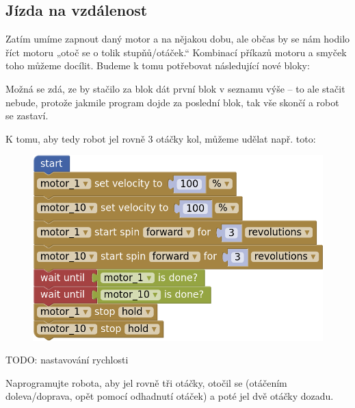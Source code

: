 \documentclass[../main.tex]{subfiles}
\begin{document}
	\subsection{Jízda na vzdálenost}\label{cha:distanceride}
	Zatím umíme zapnout daný motor a na nějakou dobu, ale občas by se nám hodilo říct motoru „otoč se o tolik stupňů/otáček.“ Kombinací příkazů motoru a smyček toho můžeme docílit. Budeme k tomu potřebovat následující nové bloky:
	\begin{itemize}
		\blockMotorDistance
		\blockMotorVelocity
		\blockWaitUntil
		\blockMotorDone
	\end{itemize}

	Možná se zdá, ze by stačilo za \blockStartImage blok dát první blok v seznamu výše -- to ale stačit nebude, protože jakmile program dojde za poslední blok, tak vše skončí a robot se zastaví.

	K tomu, aby tedy robot jel rovně 3 otáčky kol, můžeme udělat např. toto:

	\begin{figure}
		\centering
		\begin{minipage}{0.5\textwidth}
			\includegraphics[width=\linewidth]{../Images/02/sol.png}
		\end{minipage}
	\end{figure}

	TODO: nastavování rychlosti

	\begin{question}
		Naprogramujte robota, aby jel rovně tři otáčky, otočil se (otáčením doleva/doprava, opět pomocí odhadnutí otáček) a poté jel dvě otáčky dozadu.
	\end{question}
\end{document}
